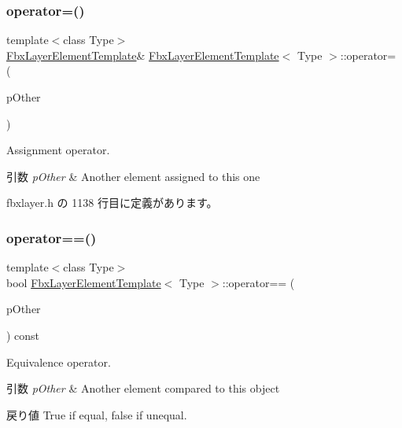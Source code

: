 \subsubsection{\texorpdfstring{operator=()}{operator=()}}
{\footnotesize\ttfamily template$<$class Type$>$ \\
\hyperlink{class_fbx_layer_element_template}{Fbx\+Layer\+Element\+Template}\& \hyperlink{class_fbx_layer_element_template}{Fbx\+Layer\+Element\+Template}$<$ Type $>$\+::operator= (\begin{DoxyParamCaption}\item[{\hyperlink{class_fbx_layer_element_template}{Fbx\+Layer\+Element\+Template}$<$ Type $>$ const \&}]{p\+Other }\end{DoxyParamCaption})\hspace{0.3cm}{\ttfamily [inline]}}

Assignment operator. 
\begin{DoxyParams}{引数}
{\em p\+Other} & Another element assigned to this one \\
\hline
\end{DoxyParams}


 fbxlayer.\+h の 1138 行目に定義があります。

\mbox{\label{class_fbx_layer_element_template_a2519d2a629f652904ff64840e0c45780}} 
\subsubsection{\texorpdfstring{operator==()}{operator==()}}
{\footnotesize\ttfamily template$<$class Type$>$ \\
bool \hyperlink{class_fbx_layer_element_template}{Fbx\+Layer\+Element\+Template}$<$ Type $>$\+::operator== (\begin{DoxyParamCaption}\item[{const \hyperlink{class_fbx_layer_element_template}{Fbx\+Layer\+Element\+Template}$<$ Type $>$ \&}]{p\+Other }\end{DoxyParamCaption}) const\hspace{0.3cm}{\ttfamily [inline]}}

Equivalence operator. 
\begin{DoxyParams}{引数}
{\em p\+Other} & Another element compared to this object \\
\hline
\end{DoxyParams}
\begin{DoxyReturn}{戻り値}
{\ttfamily True} if equal, {\ttfamily false} if unequal. 
\end{DoxyReturn}


